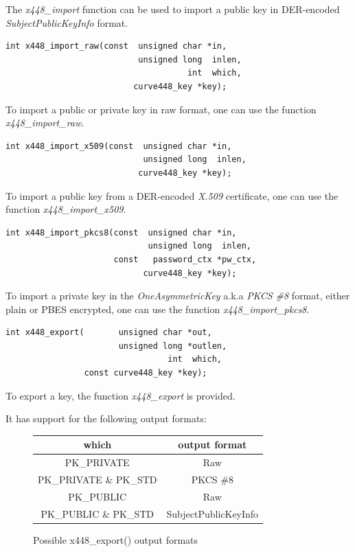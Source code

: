 \documentclass[synpaper]{book}
\begin{document}
The \textit{x448\_import} function can be used to import a public key in DER-encoded \textit{SubjectPublicKeyInfo} format.

\begin{verbatim}
int x448_import_raw(const  unsigned char *in,
                           unsigned long  inlen,
                                     int  which,
                          curve448_key *key);
\end{verbatim}

To import a public or private key in raw format, one can use the function \textit{x448\_import\_raw}.

\begin{verbatim}
int x448_import_x509(const  unsigned char *in,
                            unsigned long  inlen,
                           curve448_key *key);
\end{verbatim}

To import a public key from a DER-encoded \textit{X.509} certificate, one can use the function \textit{x448\_import\_x509}.

\begin{verbatim}
int x448_import_pkcs8(const  unsigned char *in,
                             unsigned long  inlen,
                      const   password_ctx *pw_ctx,
                            curve448_key *key);
\end{verbatim}

To import a private key in the \textit{OneAsymmetricKey} a.k.a \textit{PKCS \#8} format, either plain or PBES encrypted,
one can use the function \textit{x448\_import\_pkcs8}.

\begin{verbatim}
int x448_export(       unsigned char *out,
                       unsigned long *outlen,
                                 int  which,
                const curve448_key *key);
\end{verbatim}

To export a key, the function \textit{x448\_export} is provided.

It has support for the following output formats:

\begin{figure}[H]
\begin{center}
\begin{tabular}{|c|c|}
\hline \textbf{which} & \textbf{output format} \\
\hline PK\_PRIVATE & Raw \\
\hline PK\_PRIVATE \& PK\_STD & PKCS \#8 \\
\hline PK\_PUBLIC & Raw \\
\hline PK\_PUBLIC \& PK\_STD & SubjectPublicKeyInfo \\
\hline
\end{tabular}
\end{center}
\caption{Possible x448\_export() output formats}
\end{figure}
\end{document}
